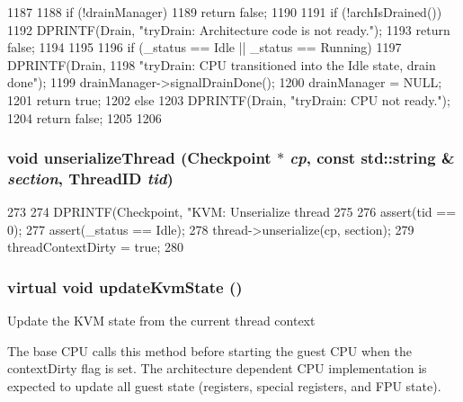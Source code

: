 \begin{DoxyCode}
1187 {
1188     if (!drainManager)
1189         return false;
1190 
1191     if (!archIsDrained()) {
1192         DPRINTF(Drain, "tryDrain: Architecture code is not ready.\n");
1193         return false;
1194     }
1195 
1196     if (_status == Idle || _status == Running) {
1197         DPRINTF(Drain,
1198                 "tryDrain: CPU transitioned into the Idle state, drain done\n");
1199         drainManager->signalDrainDone();
1200         drainManager = NULL;
1201         return true;
1202     } else {
1203         DPRINTF(Drain, "tryDrain: CPU not ready.\n");
1204         return false;
1205     }
1206 }
\end{DoxyCode}
\hypertarget{classBaseKvmCPU_a5122e6d6fdbdb3cb9ba72ae970f00a9e}{
\subsubsection[{unserializeThread}]{\setlength{\rightskip}{0pt plus 5cm}void unserializeThread ({\bf Checkpoint} $\ast$ {\em cp}, \/  const std::string \& {\em section}, \/  {\bf ThreadID} {\em tid})}}
\label{classBaseKvmCPU_a5122e6d6fdbdb3cb9ba72ae970f00a9e}



\begin{DoxyCode}
273 {
274     DPRINTF(Checkpoint, "KVM: Unserialize thread %
275 
276     assert(tid == 0);
277     assert(_status == Idle);
278     thread->unserialize(cp, section);
279     threadContextDirty = true;
280 }
\end{DoxyCode}
\hypertarget{classBaseKvmCPU_a48817be7bf03ef44cc5114ecf4df9b27}{
\subsubsection[{updateKvmState}]{\setlength{\rightskip}{0pt plus 5cm}virtual void updateKvmState ()}}
\label{classBaseKvmCPU_a48817be7bf03ef44cc5114ecf4df9b27}
Update the KVM state from the current thread context

The base CPU calls this method before starting the guest CPU when the contextDirty flag is set. The architecture dependent CPU implementation is expected to update all guest state (registers, special registers, and FPU state). 

